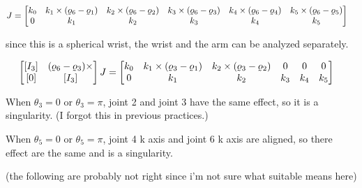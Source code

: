 \begin{solutionbox}[Q2-2]
    \footnotesize
    \begin{align*}
        J & =
        \begin{bmatrix}
            k_0                              &
            k_1 \times (\ppori{6}-\ppori{1}) &
            k_2 \times (\ppori{6}-\ppori{2}) &
            k_3 \times (\ppori{6}-\ppori{3}) &
            k_4 \times (\ppori{6}-\ppori{4}) &
            k_5 \times (\ppori{6}-\ppori{5})   \\
            0                                &
            k_1                              &
            k_2                              &
            k_3                              &
            k_4                              &
            k_5
        \end{bmatrix}
    \end{align*}


    since this is a spherical wrist, the wrist and the arm can be analyzed separately.

    \begin{align*}
        \begin{bmatrix}
            [I_3] & (\ppori{6}-\ppori{3})\times \\
            [0]   & [I_3]
        \end{bmatrix}
        J & =
        \begin{bmatrix}
            k_0                              &
            k_1 \times (\ppori{3}-\ppori{1}) &
            k_2 \times (\ppori{3}-\ppori{2}) &
            0                                &
            0                                &
            0                                  \\
            0                                &
            k_1                              &
            k_2                              &
            k_3                              &
            k_4                              &
            k_5
        \end{bmatrix}
    \end{align*}


    When $\theta_3 = 0$ or $\theta_3 = \pi$, joint 2 and joint 3 have the same effect, so it is a singularity.
    (I forgot this in previous practices.)

    When $\theta_5 = 0$ or $\theta_5=\pi$, joint 4 k axis and joint 6 k axis are aligned, so there effect are the same and is a singularity.

    (the following are probably not right since i'm not sure what suitable means here)


\end{solutionbox}
